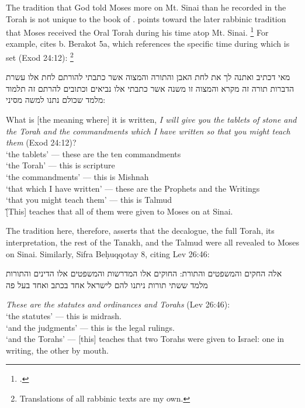 The tradition that God told Moses more on Mt. Sinai than he recorded in the Torah is not unique to the book of \jub. \vanderkam points toward the later rabbinic tradition that Moses received the Oral Torah during his time atop Mt. Sinai.%
    \footnote{\cite[28--31]{vanderkam_metso-etal2010}.}
For example, \vanderkam cites b. Berakot 5a, which references the specific time during which \jub is set (Exod 24:12):%
    \footnote{Translations of all rabbinic texts are my own.}

\begin{aramaictext}
    מאי דכתיב ואתנה לך את לחת האבן והתורה והמצוה אשר כתבתי להורתם לחת אלו עשרת הדברות תורה זה מקרא והמצוה זו משנה אשר כתבתי אלו נביאים וכתובים להרתם זה תלמוד מלמד שכולם נתנו למשה מסיני: 
\end{aramaictext}

\begin{translation}
    What is [the meaning where] it is written, \emph{I will give you the tablets of stone and the Torah and the commandments which I have written so that you might teach them} (Exod 24:12)?\\
    \-\hspace{2em}`the tablets' --- these are the ten commandments\\
    \-\hspace{2em}`the Torah' --- this is scripture\\
    \-\hspace{2em}`the commandments' --- this is Mishnah\\
    \-\hspace{2em}`that which I have written' --- these are the Prophets and the Writings\\
    \-\hspace{2em}`that you might teach them' --- this is Talmud\\\~
    [This] teaches that all of them were given to Moses on at Sinai.
\end{translation}

\noindent
The tradition here, therefore, asserts that the decalogue, the full Torah, its interpretation, the rest of the Tanakh, and the Talmud were all revealed to Moses on Sinai. Similarly, Sifra Beḥuqqotay 8, citing Lev 26:46:
\begin{aramaictext}
    אלה החקים והמשפטים והתורת: החוקים אלו המדרשות והמשפטים אלו הדינים והתורות מלמד ששתי תורות ניתנו להם לישראל אחד בכתב ואחד בעל פה
\end{aramaictext}
\begin{translation}
    \emph{These are the statutes and ordinances and Torahs} (Lev 26:46):\\
    \-\hspace{2em} `the statutes' --- this is midrash.\\
    \-\hspace{2em} `and the judgments' --- this is the legal rulings.\\
    \-\hspace{2em} `and the Torahs' --- [this] teaches that two Torahs were given to Israel: one in writing, the other by mouth.
\end{translation}

